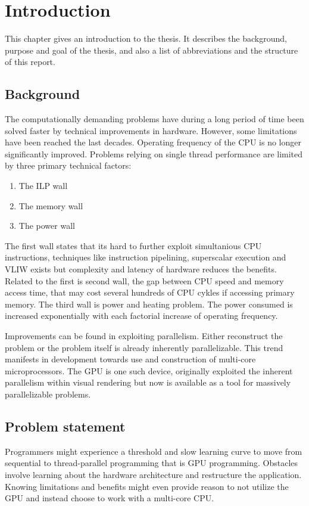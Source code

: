 \chapter{Introduction}\label{cha:intro}
This chapter gives an introduction to the thesis. It describes the background, purpose and goal of the thesis, and also a list of abbreviations and the structure of this report.

\section{Background}
The computationally demanding problems have during a long period of time been solved faster by technical improvements in hardware. However, some limitations have been reached the last decades. Operating frequency of the \gls{CPU} is no longer significantly improved. Problems relying on single thread performance are limited by three primary technical factors:
\begin{enumerate}
	\item The \gls{ILP} wall
	\item The memory wall
	\item The power wall
\end{enumerate}

The first wall states that its hard to further exploit simultanious \gls{CPU} instructions, techniques like instruction pipelining, superscalar execution and \gls{VLIW} exists but complexity and latency of hardware reduces the benefits. Related to the first is second wall, the gap between \gls{CPU} speed and memory access time, that may cost several hundreds of \gls{CPU} cykles if accessing primary memory. The third wall is power and heating problem. The power consumed is increased exponentially with each factorial increase of operating frequency.

Improvements can be found in exploiting parallelism. Either reconstruct the problem or the problem itself is already inherently parallelizable. This trend manifests in development towards use and construction of multi-core microprocessors. The \gls{GPU} is one such device, originally exploited the inherent parallelism within visual rendering but now is available as a tool for massively parallelizable problems.

\section{Problem statement}
Programmers might experience a threshold and slow learning curve to move from sequential to thread-parallel programming that is \gls{GPU} programming. Obstacles involve learning about the hardware architecture and restructure the application. Knowing limitations and benefits might even provide reason to not utilize the \gls{GPU} and instead choose to work with a multi-core \gls{CPU}.

